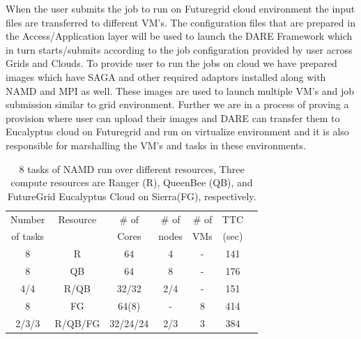 \documentclass{sig-alternate}
\begin{document}
When the user submits the job to run on Futuregrid cloud environment the input files are transferred to different VM's. The configuration files that are prepared in the Access/Application layer
will be used to launch the DARE Framework which in turn starts/submits according to the job configuration provided by user across Grids and Clouds. To provide user to run the jobs on cloud we have prepared images which have SAGA and other required adaptors installed along with NAMD and MPI as well.  These images are used to launch multiple VM's and job submission similar to grid environment. Further we are in a process of proving a provision where user can upload their images and DARE can transfer them to  Eucalyptus cloud on Futuregrid and run on virtualize environment and it is also responsible for marshalling the VM's and tasks in these environments.

 \begin{table}
\small
 \begin{tabular}{|c|c|c|c|c|c|c|} 
 \hline 
 Number           & Resource    & \# of &  \# of     &     \# of     &	TTC  \\
of tasks                &     &  Cores    &nodes&   VMs  & (sec) \\  
\hline
8& R&	64	&4 & - &141\\
\hline                  
8& QB	&	64& 8 &	-&176 \\
\hline
4/4&R/QB	&	32/32 &2/4&-&151\\
\hline
8&FG	&	64(8) & - &8&414 \\
\hline
2/3/3&R/QB/FG	&32/24/24&2/3&	3 &384\\
\hline


\end{tabular}
\caption{8 tasks of NAMD run over different resources, Three compute resources are Ranger (R), QueenBee (QB), and  FutureGrid  Eucalyptus Cloud on Sierra(FG), respectively.}

  \label{table:HTHP-Distributed} 
\end{table}
\end{document}
